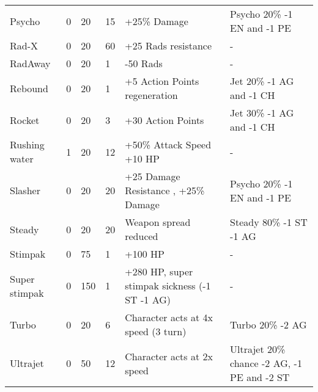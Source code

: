 \begin{longtable}{|p{4cm}|p{1.2cm}|p{1.2cm}|p{1.7cm}|p{3.6cm}|p{3.6cm}|}
Psycho & 0 & 20 & 15 & +25\% Damage  & Psycho 20\% -1 EN and -1 PE \\
Rad-X & 0 & 20 & 60 & +25 Rads resistance  & - \\
RadAway & 0 & 20 & 1 & -50 Rads & - \\
Rebound & 0 & 20 & 1 & +5 Action Points regeneration  & Jet 20\% -1 AG and -1 CH \\
Rocket & 0 & 20 & 3 & +30 Action Points  & Jet 30\% -1 AG and -1 CH \\
Rushing water & 1 & 20 & 12 & +50\% Attack Speed  +10 HP & - \\
Slasher & 0 & 20 & 20 & +25 Damage Resistance , +25\% Damage  & Psycho 20\% -1 EN and -1 PE \\
Steady & 0 & 20 & 20 & Weapon spread reduced  & Steady 80\% -1 ST -1 AG \\
Stimpak & 0 & 75 & 1 & +100 HP & - \\
Super stimpak & 0 & 150 & 1 & +280 HP, super stimpak sickness (-1 ST -1 AG)  & - \\
Turbo & 0 & 20 & 6 & Character acts at 4x speed (3 turn) & Turbo 20\% -2 AG \\
Ultrajet & 0 & 50 & 12 & Character acts at 2x speed  & Ultrajet 20\% chance -2 AG, -1 PE and -2 ST \\
\hline
\end{longtable}

